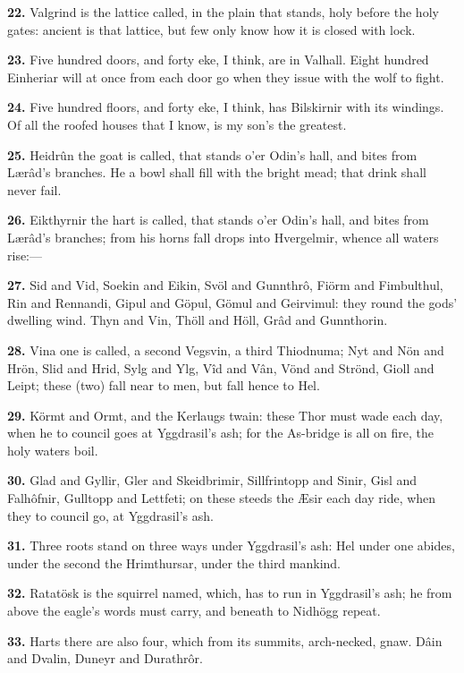 \textbf{22.} Valgrind is the lattice called, in the plain that stands, holy
before the holy gates: ancient is that lattice, but few only know how
it is closed with lock.

\textbf{23.} Five hundred doors, and forty eke, I think, are in Valhall.
Eight hundred Einheriar will at once from each door go when they issue
with the wolf to fight.

\textbf{24.} Five hundred floors, and forty eke, I think, has Bilskirnir with
its windings. Of all the roofed houses that I know, is my son's the
greatest.

\textbf{25.} Heidrûn the goat is called, that stands o'er Odin's hall, and
bites from Lærâd's branches. He a bowl shall fill with the bright
mead; that drink shall never fail.

\textbf{26.} Eikthyrnir the hart is called, that stands o'er Odin's hall, and
bites from Lærâd's branches; from his horns fall drops into
Hvergelmir, whence all waters rise:—

\textbf{27.} Sid and Vid, Soekin and Eikin, Svöl and Gunnthrô, Fiörm and
Fimbulthul, Rin and Rennandi, Gipul and Göpul, Gömul and Geirvimul:
they round the gods' dwelling wind. Thyn and Vin, Thöll and Höll, Grâd
and Gunnthorin.

\textbf{28.} Vina one is called, a second Vegsvin, a third Thiodnuma; Nyt and
Nön and Hrön, Slid and Hrid, Sylg and Ylg, Vîd and Vân, Vönd and
Strönd, Gioll and Leipt; these (two) fall near to men, but fall hence
to Hel.

\textbf{29.} Körmt and Ormt, and the Kerlaugs twain: these Thor must wade
each day, when he to council goes at Yggdrasil's ash; for the
As-bridge is all on fire, the holy waters boil.

\textbf{30.} Glad and Gyllir, Gler and Skeidbrimir, Sillfrintopp and Sinir,
Gisl and Falhôfnir, Gulltopp and Lettfeti; on these steeds the Æsir
each day ride, when they to council go, at Yggdrasil's ash.

\textbf{31.} Three roots stand on three ways under Yggdrasil's ash: Hel under
one abides, under the second the Hrimthursar, under the third mankind.

\textbf{32.} Ratatösk is the squirrel named, which, has to run in Yggdrasil's
ash; he from above the eagle's words must carry, and beneath to
Nidhögg repeat.

\textbf{33.} Harts there are also four, which from its summits, arch-necked,
gnaw. Dâin and Dvalin, Duneyr and Durathrôr.

